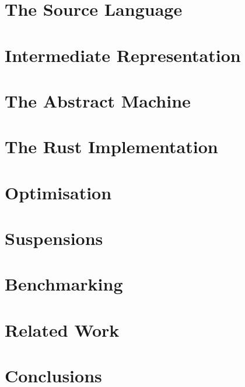 \documentclass[
  acmsmall,
  screen,
  natbib=false,
]{acmart}
\begin{document}
\section{The Source Language}
  \label{section:source}
  

\section{Intermediate Representation}
  \label{section:ir}
  

\section{The Abstract Machine}
  \label{section:machine}
  

\section{The Rust Implementation}
  \label{section:implementation}
  

\section{Optimisation}
  \label{section:optimisation}
  

\section{Suspensions}
  \label{section:suspensions}
  

\section{Benchmarking}
  \label{section:benchmarking}
  

\section{Related Work}
  \label{section:related-work}
  

\section{Conclusions}
  \label{section:conclusions}
  

\printbibliography
\end{document}
